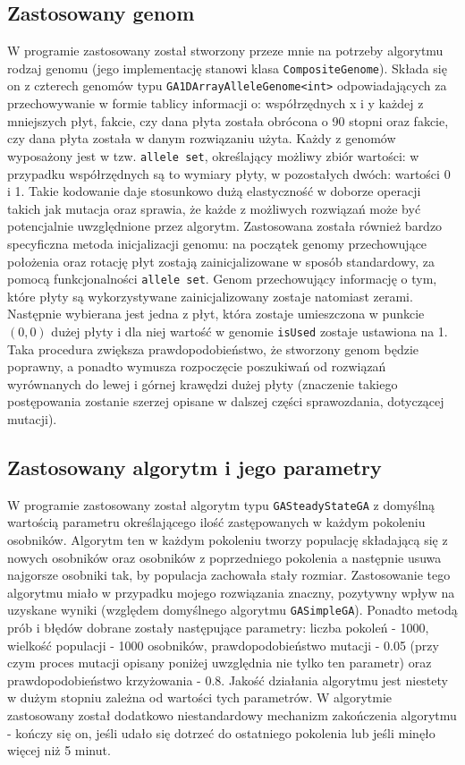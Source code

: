 \documentclass[11pt,a4paper,oneside]{article}
\begin{document}
\subsection{Zastosowany genom}
W programie zastosowany został stworzony przeze mnie na potrzeby algorytmu rodzaj genomu (jego implementację stanowi klasa \lstinline{CompositeGenome}). Składa się on z czterech genomów typu \lstinline{GA1DArrayAlleleGenome<int>} odpowiadających za przechowywanie w formie tablicy informacji o: współrzędnych x i y każdej z mniejszych płyt, fakcie, czy dana płyta została obrócona o 90 stopni oraz fakcie, czy dana płyta została w danym rozwiązaniu użyta. Każdy z genomów wyposażony jest w tzw. \lstinline{allele set}, określający możliwy zbiór wartości: w przypadku współrzędnych są to wymiary płyty, w pozostałych dwóch: wartości 0 i 1. Takie kodowanie daje stosunkowo dużą elastyczność w doborze operacji takich jak mutacja oraz sprawia, że każde z możliwych rozwiązań może być potencjalnie uwzględnione przez algorytm. Zastosowana została również bardzo specyficzna metoda inicjalizacji genomu: na początek genomy przechowujące położenia oraz rotację płyt zostają zainicjalizowane w sposób standardowy, za pomocą funkcjonalności \lstinline{allele set}. Genom przechowujący informację o tym, które płyty są wykorzystywane zainicjalizowany zostaje natomiast zerami. Następnie wybierana jest jedna z płyt, która zostaje umieszczona w punkcie $(0, 0)$ dużej płyty i dla niej wartość w genomie \lstinline{isUsed} zostaje ustawiona na 1. Taka procedura zwiększa prawdopodobieństwo, że stworzony genom będzie poprawny, a ponadto wymusza rozpoczęcie poszukiwań od rozwiązań wyrównanych do lewej i górnej krawędzi dużej płyty (znaczenie takiego postępowania zostanie szerzej opisane w dalszej części sprawozdania, dotyczącej mutacji).


\subsection{Zastosowany algorytm i jego parametry}
W programie zastosowany został algorytm typu \lstinline{GASteadyStateGA} z domyślną wartością parametru określającego ilość zastępowanych w każdym pokoleniu osobników. Algorytm ten w każdym pokoleniu tworzy populację składającą się z nowych osobników oraz osobników z poprzedniego pokolenia a następnie usuwa najgorsze osobniki tak, by populacja zachowała stały rozmiar. Zastosowanie tego algorytmu miało w przypadku mojego rozwiązania znaczny, pozytywny wpływ na uzyskane wyniki (względem domyślnego algorytmu \lstinline{GASimpleGA}). Ponadto metodą prób i błędów dobrane zostały następujące parametry: liczba pokoleń - 1000, wielkość populacji - 1000 osobników, prawdopodobieństwo mutacji - 0.05 (przy czym proces mutacji opisany poniżej uwzględnia nie tylko ten parametr) oraz prawdopodobieństwo krzyżowania - 0.8. Jakość działania algorytmu jest niestety w dużym stopniu zależna od wartości tych parametrów. W algorytmie zastosowany został dodatkowo niestandardowy mechanizm zakończenia algorytmu - kończy się on, jeśli udało się dotrzeć do ostatniego pokolenia lub jeśli minęło więcej niż 5 minut.
\end{document}
